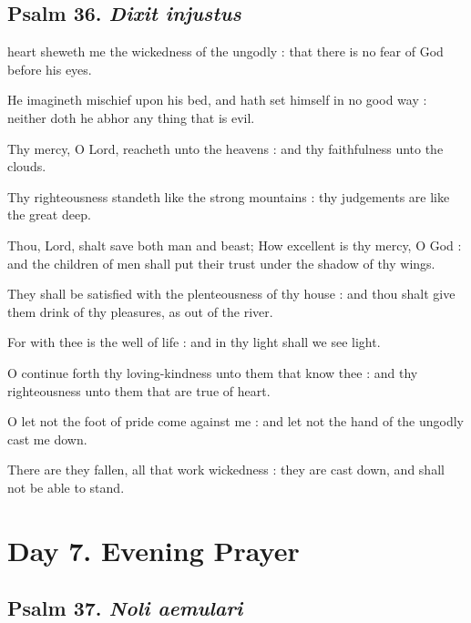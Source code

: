 \subsection{Psalm 36. \textit{Dixit injustus}}

 heart sheweth me the wickedness of the ungodly : that there is no fear of God before his eyes.\par
{}
He imagineth mischief upon his bed, and hath set himself in no good way : neither doth he abhor any thing that is evil.\par
{}Thy mercy, O Lord, reacheth unto the heavens : and thy faithfulness unto the clouds.\par
{}Thy righteousness standeth like the strong mountains : thy judgements are like the great deep.\par
{}Thou, Lord, shalt save both man and beast; How excellent is thy mercy, O God : and the children of men shall put their trust under the shadow of thy wings.\par
{}They shall be satisfied with the plenteousness of thy house : and thou shalt give them drink of thy pleasures, as out of the river.\par
{}For with thee is the well of life : and in thy light shall we see light.\par
{}O continue forth thy loving-kindness unto them that know thee : and thy righteousness unto them that are true of heart.\par
{}O let not the foot of pride come against me : and let not the hand of the ungodly cast me down.\par
{}There are they fallen, all that work wickedness : they are cast down, and shall not be able to stand.\par


\clearpage
\section*{Day 7. Evening Prayer}

\subsection{Psalm 37. \textit{Noli aemulari}}

